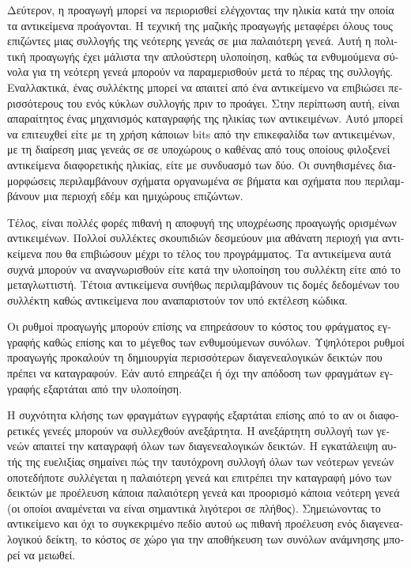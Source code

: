 \begin{greek}
Δεύτερον, η προαγωγή μπορεί να περιορισθεί ελέγχοντας την ηλικία
κατά την οποία τα αντικείμενα προάγονται. Η τεχνική της μαζικής
προαγωγής μεταφέρει όλους τους επιζώντες μιας συλλογής της νεότερης
γενεάς σε μια παλαιότερη γενεά. Αυτή η πολιτική προαγωγής έχει
μάλιστα την απλούστερη υλοποίηση, καθώς τα ενθυμούμενα σύνολα
για τη νεότερη γενεά μπορούν να παραμερισθούν μετά το πέρας
της συλλογής. Εναλλακτικά, ένας συλλέκτης μπορεί να απαιτεί
από ένα αντικείμενο να επιβιώσει περισσότερους του ενός κύκλων
συλλογής πριν το προάγει. Στην περίπτωση αυτή, είναι απαραίτητος
ένας μηχανισμός καταγραφής της ηλικίας των αντικειμένων. Αυτό
μπορεί να επιτευχθεί είτε με τη χρήση κάποιων bits από την
επικεφαλίδα των αντικειμένων, με τη διαίρεση μιας γενεάς σε
σε υποχώρους ο καθένας από τους οποίους φιλοξενεί αντικείμενα
διαφορετικής ηλικίας, είτε με συνδυασμό των δύο. Οι συνηθισμένες
διαμορφώσεις περιλαμβάνουν σχήματα οργανωμένα σε βήματα και
σχήματα που περιλαμβάνουν μια περιοχή εδέμ και ημιχώρους επιζώντων.

Τέλος, είναι πολλές φορές πιθανή η αποφυγή της υποχρέωσης
προαγωγής ορισμένων αντικειμένων. Πολλοί συλλέκτες σκουπιδιών
δεσμεύουν μια αθάνατη περιοχή για αντικείμενα που θα επιβιώσουν
μέχρι το τέλος του προγράμματος. Τα αντικείμενα αυτά συχνά μπορούν
να αναγνωρισθούν είτε κατά την υλοποίηση του συλλέκτη είτε από
το μεταγλωττιστή. Τέτοια αντικείμενα συνήθως περιλαμβάνουν
τις δομές δεδομένων του συλλέκτη καθώς αντικείμενα που αναπαριστούν
τον υπό εκτέλεση κώδικα.

Οι ρυθμοί προαγωγής μπορούν επίσης να επηρεάσουν το κόστος του
φράγματος εγγραφής καθώς επίσης και το μέγεθος των ενθυμούμενων
συνόλων. Υψηλότεροι ρυθμοί προαγωγής προκαλούν τη δημιουργία
περισσότερων διαγενεαλογικών δεικτών που πρέπει να καταγραφούν.
Εάν αυτό επηρεάζει ή όχι την απόδοση των φραγμάτων εγγραφής
εξαρτάται από την υλοποίηση.

Η συχνότητα κλήσης των φραγμάτων εγγραφής εξαρτάται επίσης
από το αν οι διαφορετικές γενεές μπορούν να συλλεχθούν ανεξάρτητα.
Η ανεξάρτητη συλλογή των γενεών απαιτεί την καταγραφή όλων
των διαγενεαλογικών δεικτών. Η εγκατάλειψη αυτής της ευελιξίας
σημαίνει πώς την ταυτόχρονη συλλογή όλων των νεότερων γενεών
οποτεδήποτε συλλέγεται η παλαιότερη γενεά και επιτρέπει την
καταγραφή μόνο των δεικτών με προέλευση κάποια παλαιότερη
γενεά και προορισμό κάποια νεότερη γενεά (οι οποίοι αναμένεται
να είναι σημαντικά λιγότεροι σε πλήθος). Σημειώνοντας το
αντικείμενο και όχι το συγκεκριμένο πεδίο αυτού ως πιθανή
προέλευση ενός διαγενεαλογικού δείκτη, το κόστος σε χώρο για
την αποθήκευση των συνόλων ανάμνησης μπορεί να μειωθεί.


\end{greek}
